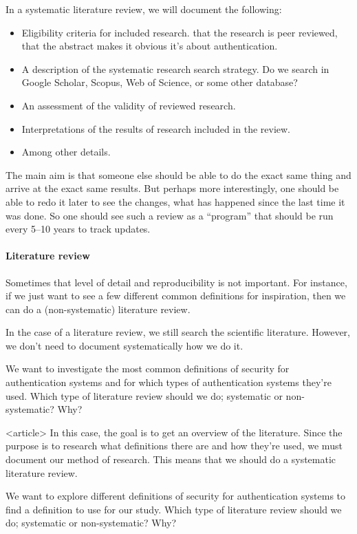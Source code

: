 In a systematic literature review, we will document the 
following\autocite{ElsevierSLR}:
\begin{itemize}
  \item Eligibility criteria for included research.
    \Eg that the research is peer reviewed, that the abstract makes it 
    obvious it's about authentication.
  \item A description of the systematic research search strategy.
    Do we search in Google Scholar, Scopus, Web of Science, or some other 
    database?
  \item An assessment of the validity of reviewed research.
  \item Interpretations of the results of research included in the review.
  \item Among other details.
\end{itemize}
The main aim is that someone else should be able to do the exact same thing and 
arrive at the exact same results.
But perhaps more interestingly, one should be able to redo it later to see the 
changes, what has happened since the last time it was done.
So one should see such a review as a \enquote{program} that should be run every 
5--10 years to track updates.

\paragraph{Literature review}

Sometimes that level of detail and reproducibility is not important.
For instance, if we just want to see a few different common definitions for 
inspiration, then we can do a (non-systematic) literature review.

In the case of a literature review, we still search the scientific literature.
However, we don't need to document systematically how we do it.

\begin{frame}
  \begin{exercise}
    We want to investigate \alert<2>{the most common} definitions of security 
    for authentication systems and for which types of authentication systems 
    they're used.
    Which type of literature review should we do; systematic or non-systematic?
    Why?
  \end{exercise}

  \begin{onlyenv}<article>
In this case, the goal is to get an overview of the literature.
Since the purpose is to research what definitions there are and how they're 
used, we must document our method of research.
This means that we should do a systematic literature review.
  \end{onlyenv}

  \begin{exercise}
    We want to \alert<2>{explore different} 
    definitions of security for authentication systems to find a definition to 
    use for our study.
    Which type of literature review should we do; systematic or non-systematic?
    Why?
  \end{exercise}
\end{frame}

